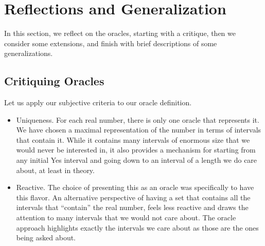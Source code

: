 \documentclass[12pt]{article}
\begin{document}
\section{Reflections and Generalization}

In this section, we reflect on the oracles, starting with a critique, then we consider some extensions, and finish with brief descriptions of some generalizations. 


\subsection{Critiquing Oracles}

Let us apply our subjective criteria to our oracle definition. 

\begin{itemize}
    \item Uniqueness. For each real number, there is only one oracle that represents it. We have chosen a maximal representation of the number in terms of intervals that contain it. While it contains many intervals of enormous size that we would never be interested in, it also provides a mechanism for starting from any initial Yes interval and going down to an interval of a length we do care about, at least in theory. 
    \item Reactive. The choice of presenting this as an oracle was specifically to have this flavor. An alternative perspective of having a set that contains all the intervals that ``contain'' the real number, feels less reactive and draws the attention to many intervals that we would not care about. The oracle approach highlights exactly the intervals we care about as those are the ones being asked about. 
    

\end{itemize}
\end{document}
